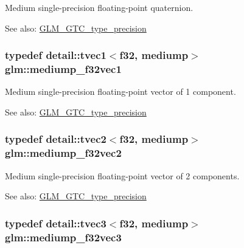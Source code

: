 Medium single-precision floating-point quaternion. \begin{Desc}
\item[See also:]\hyperlink{group__gtc__type__precision}{GLM\_\-GTC\_\-type\_\-precision} \end{Desc}
\hypertarget{group__gtc__type__precision_gf3d4077b241fbcab529fb0e0d88c0df6}{
\subsubsection[mediump\_\-f32vec1]{\setlength{\rightskip}{0pt plus 5cm}typedef detail::tvec1$<$f32, mediump$>$ {\bf glm::mediump\_\-f32vec1}}}
\label{group__gtc__type__precision_gf3d4077b241fbcab529fb0e0d88c0df6}


Medium single-precision floating-point vector of 1 component. \begin{Desc}
\item[See also:]\hyperlink{group__gtc__type__precision}{GLM\_\-GTC\_\-type\_\-precision} \end{Desc}
\hypertarget{group__gtc__type__precision_gf53d380f948fdbb540eab960f2ad4b58}{
\subsubsection[mediump\_\-f32vec2]{\setlength{\rightskip}{0pt plus 5cm}typedef detail::tvec2$<$f32, mediump$>$ {\bf glm::mediump\_\-f32vec2}}}
\label{group__gtc__type__precision_gf53d380f948fdbb540eab960f2ad4b58}


Medium single-precision floating-point vector of 2 components. \begin{Desc}
\item[See also:]\hyperlink{group__gtc__type__precision}{GLM\_\-GTC\_\-type\_\-precision} \end{Desc}
\hypertarget{group__gtc__type__precision_gda8879dd10f28428e2eb1ae62f643f65}{
\subsubsection[mediump\_\-f32vec3]{\setlength{\rightskip}{0pt plus 5cm}typedef detail::tvec3$<$f32, mediump$>$ {\bf glm::mediump\_\-f32vec3}}}
\label{group__gtc__type__precision_gda8879dd10f28428e2eb1ae62f643f65}


